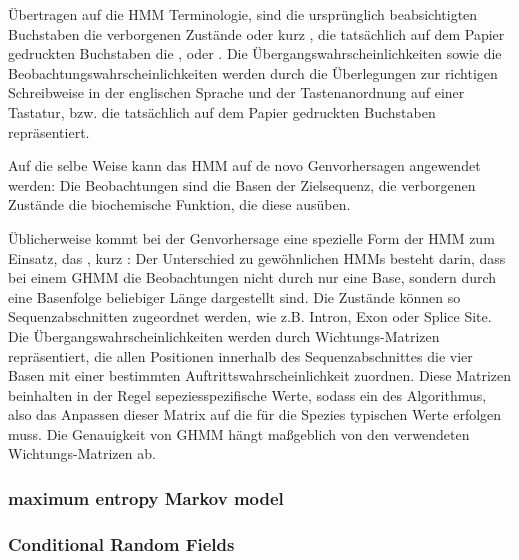 Übertragen auf die HMM Terminologie, sind die ursprünglich beabsichtigten
Buchstaben die verborgenen Zustände oder kurz , die tatsächlich
auf dem Papier gedruckten Buchstaben die , oder
.
 Die Übergangswahrscheinlichkeiten sowie die Beobachtungswahrscheinlichkeiten
 werden durch die Überlegungen zur richtigen Schreibweise in der englischen
 Sprache und der Tastenanordnung auf einer Tastatur, bzw. die tatsächlich auf
 dem Papier gedruckten Buchstaben repräsentiert.

Auf die selbe Weise kann das HMM auf de novo  Genvorhersagen
angewendet werden:
Die Beobachtungen sind die Basen der Zielsequenz, die verborgenen Zustände die
biochemische Funktion, die diese ausüben.

Üblicherweise kommt bei der Genvorhersage eine spezielle Form der HMM zum
Einsatz, das , kurz :
Der Unterschied zu gewöhnlichen HMMs besteht darin, dass bei einem GHMM die
Beobachtungen nicht durch nur eine Base, sondern durch eine Basenfolge
beliebiger Länge dargestellt sind.
Die Zustände können so Sequenzabschnitten zugeordnet werden, wie z.B. Intron,
Exon oder Splice Site.
Die Übergangswahrscheinlichkeiten werden durch Wichtungs-Matrizen
repräsentiert, die allen Positionen innerhalb des Sequenzabschnittes die vier
Basen mit einer bestimmten Auftrittswahrscheinlichkeit zuordnen.
Diese Matrizen beinhalten in der Regel sepeziesspezifische Werte, sodass ein
 des Algorithmus, also das Anpassen dieser Matrix auf die für die
Spezies typischen Werte erfolgen muss.
Die Genauigkeit von GHMM hängt maßgeblich von den verwendeten
Wichtungs-Matrizen ab.
\citep{pmid16339376, pmid17687368, pmid10779491, durbin_biological_1998}

\subsubsection{maximum entropy Markov model}

\subsubsection{Conditional Random Fields}
